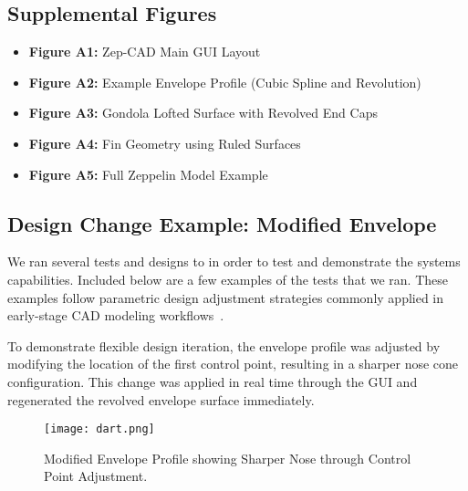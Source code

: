 \documentclass[10pt]{article}
\begin{document}
\subsection*{Supplemental Figures}

\begin{itemize}
    \item \textbf{Figure A1:} Zep-CAD Main GUI Layout
    \item \textbf{Figure A2:} Example Envelope Profile (Cubic Spline and Revolution)
    \item \textbf{Figure A3:} Gondola Lofted Surface with Revolved End Caps
    \item \textbf{Figure A4:} Fin Geometry using Ruled Surfaces
    \item \textbf{Figure A5:} Full Zeppelin Model Example
\end{itemize}

\vspace{1em}

\subsection*{Design Change Example: Modified Envelope}

We ran several tests and designs to in order to test and demonstrate the systems capabilities. Included below are 
a few examples of the tests that we ran. These examples follow parametric design adjustment strategies commonly 
applied in early-stage CAD modeling workflows~\cite{chang2014}.


To demonstrate flexible design iteration, the envelope profile was adjusted by modifying the location of the 
first control point, resulting in a sharper nose cone configuration. This change was applied in real time 
through the GUI and regenerated the revolved envelope surface immediately.

\begin{figure}[h!]
    \centering
    \texttt{[image: dart.png]} %
    \caption{Modified Envelope Profile showing Sharper Nose through Control Point Adjustment.}
\end{figure}

\end{document}
